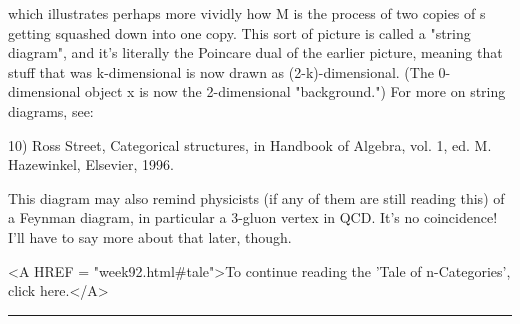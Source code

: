 which illustrates perhaps more vividly how M is the process of two 
copies of s getting squashed down into one copy.  This sort of picture
is called a "string diagram", and it's literally the Poincare dual of
the earlier picture, meaning that stuff that was k-dimensional is now
drawn as (2-k)-dimensional.   (The 0-dimensional object x is now the
2-dimensional "background.")  For more on string diagrams, see:

10) Ross Street, Categorical structures, in Handbook of Algebra, vol. 1,
ed. M. Hazewinkel, Elsevier, 1996.

This diagram may also remind physicists (if any of them are still
reading this) of a Feynman diagram, in particular a 3-gluon vertex in
QCD.  It's no coincidence!  I'll have to say more about that later,
though.

<A HREF = "week92.html#tale">To continue reading the 'Tale of
n-Categories', click here.</A>

\par\noindent\rule{\textwidth}{0.4pt}

